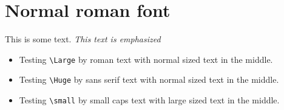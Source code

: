 \documentclass{article}
\begin{document}
\section{Normal roman font}

This is some text.  \emph{This text is emphasized}
\begin{itemize}
\item
Testing \verb#\Large# by {\Large roman text with {\normalsize normal sized text} in the middle}.
\item
Testing \verb#\Huge# by {\sf\Huge sans serif text with {\normalsize normal sized text} in the middle}.
\item
Testing \verb#\small# by {\sc\small small caps text with {\large large sized text} in the middle}.
\end{itemize}
\end{document}
